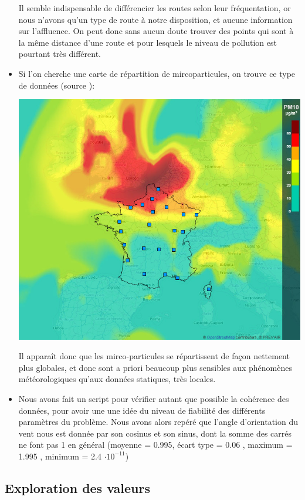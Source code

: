 \begin{itemize}
    Il semble indispensable de différencier les routes selon leur fréquentation, or nous n'avons qu'un type de route à notre disposition, et aucune information sur l'affluence.
    On peut donc sans aucun doute trouver des points qui sont à la même distance d'une route et pour lesquels le niveau de pollution est pourtant très différent.
  \item
    Si l'on cherche une carte de répartition de mircoparticules, on trouve ce type de données (source \cite{pollutionWebsite2}):
  	\begin{center}
  		\includegraphics[width = 0.5\linewidth]{images/francepm10.jpg}
  	\end{center}
  	Il apparaît donc que les mirco-particules se répartissent de façon nettement plus globales, et donc sont a priori beaucoup plus sensibles aux phénomènes météorologiques qu'aux données statiques, très locales.
  \item
    Nous avons fait un script pour vérifier autant que possible la cohérence des données, pour avoir une une idée du niveau de fiabilité des différents paramètres du problème. Nous avons alors repéré que l'angle d'orientation du vent nous est donnée par son cosinus et son sinus, dont la somme des carrés ne font pas 1 en général (moyenne = 0.995, écart type =  0.06 , maximum =  1.995 , minimum = 2.4 $\cdot 10^{-11}$)
\end{itemize}



\subsection{Exploration des valeurs}

